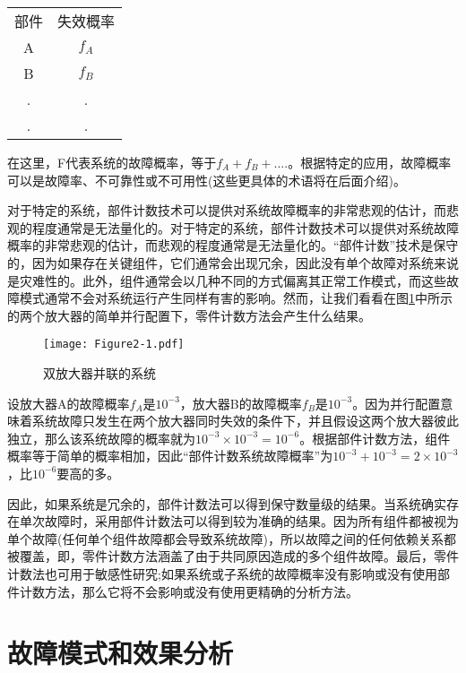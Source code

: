 \documentclass[cn,11pt,chinese]{elegantbook}
\begin{document}
\begin{table}
	\centering
	\begin{tabular}{c c}
		部件& 失效概率  \\
		A &  $f_A$\\
		B & $f_B$  \\
		. & .  \\
		. & .  \\
	\end{tabular}
\end{table}

在这里，F代表系统的故障概率，等于$f_A+f_B+....$。根据特定的应用，故障概率可以是故障率、不可靠性或不可用性(这些更具体的术语将在后面介绍)。

对于特定的系统，部件计数技术可以提供对系统故障概率的非常悲观的估计，而悲观的程度通常是无法量化的。对于特定的系统，部件计数技术可以提供对系统故障概率的非常悲观的估计，而悲观的程度通常是无法量化的。“部件计数”技术是保守的，因为如果存在关键组件，它们通常会出现冗余，因此没有单个故障对系统来说是灾难性的。此外，组件通常会以几种不同的方式偏离其正常工作模式，而这些故障模式通常不会对系统运行产生同样有害的影响。然而，让我们看看在图\ref{fig:fig2_1}中所示的两个放大器的简单并行配置下，零件计数方法会产生什么结果。

\begin{figure}[htpb]
	\centering
	\texttt{[image: Figure2-1.pdf]}
	\caption{双放大器并联的系统}\label{fig:fig2_1}
\end{figure}

设放大器A的故障概率$f_A$是$10^{-3}$，放大器B的故障概率$f_B$是$10^{-3}$。因为并行配置意味着系统故障只发生在两个放大器同时失效的条件下，并且假设这两个放大器彼此独立，那么该系统故障的概率就为$10^{-3}\times 10^{-3} = 10^{-6}$。根据部件计数方法，组件概率等于简单的概率相加，因此“部件计数系统故障概率”为$10^{-3}+10^{-3}=2 \times 10^{-3}$，比$10^{-6}$要高的多。

因此，如果系统是冗余的，部件计数法可以得到保守数量级的结果。当系统确实存在单次故障时，采用部件计数法可以得到较为准确的结果。因为所有组件都被视为单个故障(任何单个组件故障都会导致系统故障)，所以故障之间的任何依赖关系都被覆盖，即，零件计数方法涵盖了由于共同原因造成的多个组件故障。最后，零件计数法也可用于敏感性研究;如果系统或子系统的故障概率没有影响或没有使用部件计数方法，那么它将不会影响或没有使用更精确的分析方法。

\section{故障模式和效果分析}
\end{document}
